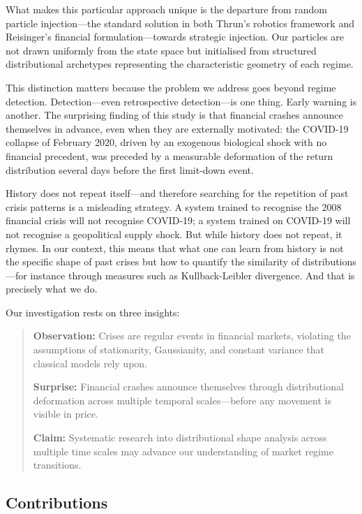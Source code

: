 \documentclass[11pt]{article}
\begin{document}
What makes this particular approach unique is the departure from random
particle injection---the standard solution in both Thrun's robotics
framework and Reisinger's financial formulation---towards strategic
injection. Our particles are not drawn uniformly from the state space
but initialised from structured distributional archetypes representing
the characteristic geometry of each regime.

This distinction matters because the problem we address goes beyond
regime detection. Detection---even retrospective detection---is one
thing. Early warning is another. The surprising finding of this study is
that financial crashes announce themselves in advance, even when they
are externally motivated: the COVID-19 collapse of February 2020, driven
by an exogenous biological shock with no financial precedent, was
preceded by a measurable deformation of the return distribution several
days before the first limit-down event.

History does not repeat itself---and therefore searching for the
repetition of past crisis patterns is a misleading strategy. A system
trained to recognise the 2008 financial crisis will not recognise
COVID-19; a system trained on COVID-19 will not recognise a geopolitical
supply shock. But while history does not repeat, it rhymes. In our
context, this means that what one can learn from history is not the
specific shape of past crises but how to quantify the similarity of
distributions---for instance through measures such as Kullback-Leibler
divergence. And that is precisely what we do.

Our investigation rests on three insights:

\begin{quote}
\textbf{Observation:} Crises are regular events in financial markets,
violating the assumptions of stationarity, Gaussianity, and constant
variance that classical models rely upon.

\textbf{Surprise:} Financial crashes announce themselves through
distributional deformation across multiple temporal scales---before any
movement is visible in price.

\textbf{Claim:} Systematic research into distributional shape analysis
across multiple time scales may advance our understanding of market
regime transitions.
\end{quote}

\subsection{Contributions}
\end{document}
